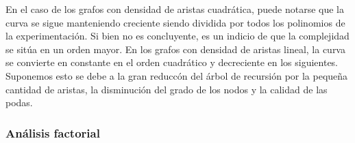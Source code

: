 En el caso de los grafos con densidad de aristas cuadr\'atica, puede notarse que la curva se sigue manteniendo creciente siendo dividida por todos los polinomios de la experimentaci\'on. Si bien no es concluyente, es un indicio de que la complejidad se sit\'ua en un orden mayor. En los grafos con densidad de aristas lineal, la curva se convierte en constante en el orden cuadr\'atico y decreciente en los siguientes. Suponemos esto se debe a la gran reducc\'on del \'arbol de recursi\'on por la peque\~na cantidad de aristas, la disminuci\'on del grado de los nodos y la calidad de las podas.

\subsubsection{An\'alisis factorial}
